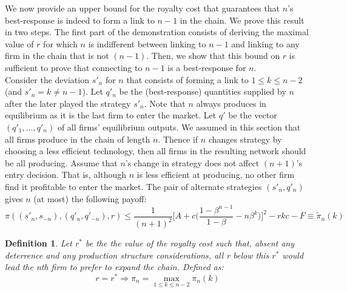 \documentclass{article}
\newtheorem{definition}{Definition}
\begin{document}
We now provide an upper bound for the royalty cost that guarantees that $n$'s best-response is indeed to form a link to $n-1$ in the chain. We prove this result in two steps. The first part of the demonstration consists of deriving the maximal value of $r$ for which $n$ is indifferent between linking to $n-1$ and linking to any firm in the chain that is not $(n-1)$. Then, we show that this bound on $r$ is sufficient to prove that connecting to $n-1$ is a best-response for $n$. \\
\indent Consider the deviation $s'_n$ for $n$ that consists of forming a link to $1\leq k\leq n-2$ (and $s'_n=k\neq n-1$). Let $q'_n$ be the (best-response) quantities supplied by $n$ after the later played the strategy $s'_n$. Note that $n$ always produces in equilibrium as it is the last firm to enter the market. Let $q'$ be the vector $(q'_1, \ldots, q'_n)$ of all firms' equilibrium outputs. We assumed in this section that all firms produce in the chain of length $n$. Thence if $n$ changes strategy by choosing a less efficient technology, then all firms in the resulting network should be all producing. Assume that $n$'s change in strategy does not affect $(n+1)$'s entry decision. That is, although $n$ is less efficient at producing, no other firm find it profitable to enter the market. The pair of alternate strategies $(s'_n,q'_n)$ gives $n$ (at most) the following payoff:   
\begin{equation}
    \pi((s'_n,s_{-n}),(q'_n,q'_{-n}), r)\leq \dfrac{1}{(n+1)^2}\Big[ A +c \Big( \dfrac{1-\beta^{n-1}}{1-\beta}-n\beta^{k}\Big)\Big]^2-rkc-F\equiv \tilde{\pi}_n(k) 
\end{equation}

\begin{definition}
Let $r^*$ be the the value of the royalty cost such that, absent any deterrence and any production structure considerations, all r below this $r^*$ would lead the nth firm to prefer to expand the chain. Defined as: 
\begin{equation*}
    r=r^* \Rightarrow \pi_n=\max_{1\leq k\leq n-2}\pi_n(k) 
\end{equation*}
\end{definition}
\end{document}
